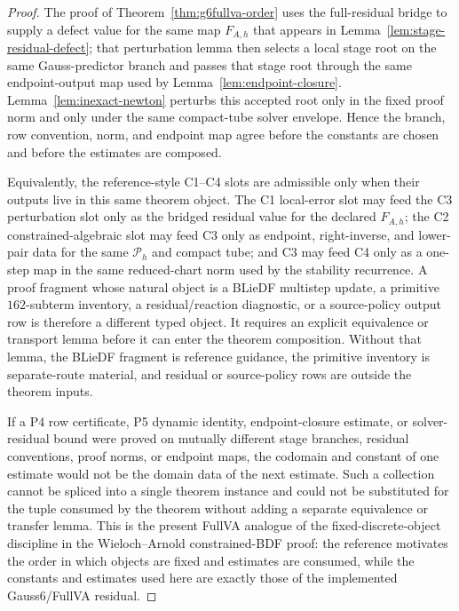 \documentclass[preprint,12pt]{elsarticle}
\begin{document}
\begin{proof}
The proof of Theorem~\ref{thm:g6fullva-order} uses the full-residual bridge
to supply a defect value for the same map \(F_{A,h}\) that appears in
Lemma~\ref{lem:stage-residual-defect}; that perturbation lemma then selects a
local stage root on the same Gauss-predictor branch and passes that stage
root through the same endpoint-output map used by Lemma~\ref{lem:endpoint-closure}.
Lemma~\ref{lem:inexact-newton} perturbs this accepted root only in the fixed
proof norm and only under the same compact-tube solver envelope.  Hence the
branch, row convention, norm, and endpoint map agree before the constants are
chosen and before the estimates are composed.

Equivalently, the reference-style C1--C4 slots are admissible only when their
outputs live in this same theorem object.  The C1 local-error slot may feed
the C3 perturbation slot only as the bridged residual value for the declared
\(F_{A,h}\); the C2 constrained-algebraic slot may feed C3 only as endpoint,
right-inverse, and lower-pair data for the same \(\mathcal P_h\) and compact
tube; and C3 may feed C4 only as a one-step map in the same reduced-chart
norm used by the stability recurrence.  A proof fragment whose natural
object is a BLieDF multistep update, a primitive \(162\)-subterm inventory, a
residual/reaction diagnostic, or a source-policy output row is therefore a
different typed object.  It requires an explicit equivalence or transport
lemma before it can enter the theorem composition.  Without that lemma, the
BLieDF fragment is reference guidance, the primitive inventory is
separate-route material, and residual or source-policy rows are outside the
theorem inputs.

If a P4 row certificate, P5 dynamic identity, endpoint-closure estimate, or
solver-residual bound were proved on mutually different stage branches,
residual conventions, proof norms, or endpoint maps, the codomain and
constant of one estimate would not be the domain data of the next estimate.
Such a collection cannot be spliced into a single theorem instance and could
not be substituted for the tuple consumed by the theorem without adding a
separate equivalence or transfer lemma.  This is the present FullVA analogue
of the fixed-discrete-object discipline in the
Wieloch--Arnold constrained-BDF proof: the reference motivates the order in
which objects are fixed and estimates are consumed, while the constants and
estimates used here are exactly those of the implemented Gauss6/FullVA
residual.
\end{proof}
\end{document}
